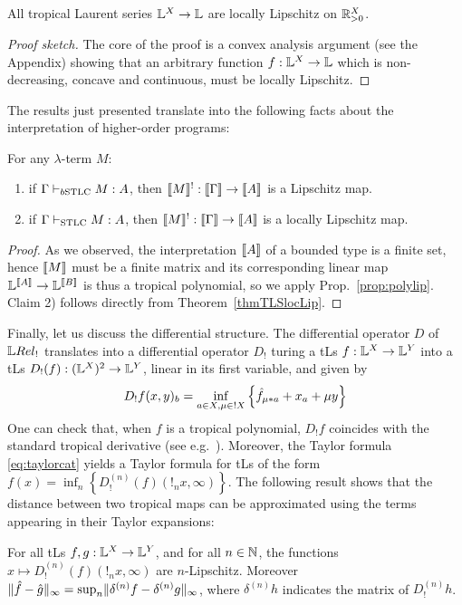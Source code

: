 \begin{theorem}\label{thmTLSlocLip}
 All tropical Laurent series $\mathbb{L}^X\to\mathbb{L}$ are locally Lipschitz on $\mathbb{R}_{>0}^X$.
\end{theorem}
\begin{proof}[Proof sketch]
The core of the proof is a convex analysis argument (see the Appendix) showing that an arbitrary function $f:\mathbb{L}^X\to\mathbb{L}$ which is non-decreasing, concave and continuous, must be locally Lipschitz. 
\end{proof}


The results just presented translate into the following facts about the interpretation of higher-order programs:
\begin{corollary}
For any $\lambda$-term $M$:
\begin{enumerate}
\item if $\Gamma \vdash_{\BSTLC} M:A$, then $\llbracket M\rrbracket^!:\llbracket\Gamma\rrbracket \to \llbracket A\rrbracket$ is a Lipschitz map.
\item if $\Gamma \vdash_{\mathrm{STLC}}M:A$, then $\llbracket M\rrbracket^!: \llbracket\Gamma\rrbracket \to \llbracket A\rrbracket$ is a locally Lipschitz map.
\end{enumerate}
\end{corollary} 
\begin{proof}
As we observed, the interpretation $\llbracket A\rrbracket$ of a bounded type is a finite set, hence $\llbracket M\rrbracket$ must be a finite matrix  and  its corresponding linear map $\mathbb{L}^{\llbracket A\rrbracket} \to \mathbb{L}^{\llbracket B\rrbracket}$ is thus a tropical polynomial, so we apply Prop.~\ref{prop:polylip}.
Claim 2) follows directly from Theorem~\ref{thmTLSlocLip}.
\end{proof}


Finally, let us discuss the differential structure. The differential operator $D$ of $\LREL_{!}$ translates into a differential operator $D_{!}$ turing a tLs $f:\mathbb{L}^{X}\to \mathbb{L}^{Y}$ into a tLs $D_{!}(f):(\mathbb{L}^{X})^{2}\to \mathbb{L}^{Y}$, linear in its first variable, and given by 
\begin{equation}
D_{!}f(x,y)_{b}=\inf_{a\in X, \mu\in !X}\left\{\hat{f}_{\mu*a}+x_{a}+\mu y\right\}
\end{equation}
One can check that, when $f$ is a tropical polynomial, $D_{!}f$ coincides with the standard tropical derivative (see e.g.~\cite{Grigoriev2017}).
Moreover, the Taylor formula \eqref{eq:taylorcat} yields 
a Taylor formula for tLs of the form 
$f(x)=\inf_{n}\left\{D_{!}^{(n)}(f)(!_{n}x,\infty)\right\}$.
The following result shows that the distance between two tropical maps can be approximated using the terms appearing in their Taylor expansions:
\begin{proposition}
For all tLs $f,g: \mathbb{L}^{X}\to \mathbb{L}^{Y}$, and for all $n\in \mathbb{N}$, 
the functions $x\mapsto D_{!}^{(n)}(f)(!_{n}x,\infty)$ are $n$-Lipschitz. Moreover 
$\lVert \hat{f}-\hat{g}\rVert_{\infty}= \sup_{n} \lVert {\delta^{(n)}f}- {\delta^{(n)}g}\rVert_{\infty}$, 
where $\delta^{(n)}h$ indicates the matrix of $D_{!}^{(n)}h$.
\end{proposition} 


